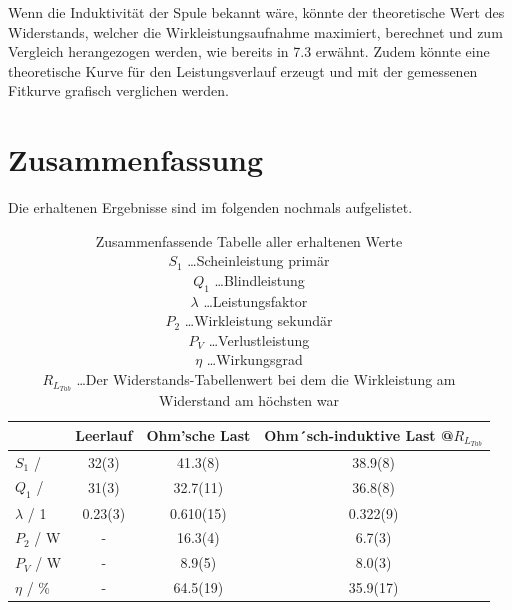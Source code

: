 \documentclass[11pt,ngerman]{scrartcl}
\begin{document}
\vspace{2mm}

Wenn die Induktivität der Spule bekannt wäre, könnte der theoretische Wert des
Widerstands, welcher die Wirkleistungsaufnahme maximiert, berechnet und
zum Vergleich herangezogen werden, wie bereits in 7.3 erwähnt. Zudem könnte eine theoretische Kurve für den
Leistungsverlauf erzeugt und mit der gemessenen Fitkurve grafisch verglichen
werden.





\section{Zusammenfassung}

Die erhaltenen Ergebnisse sind im folgenden nochmals aufgelistet.

\begin{table}[H]
	\caption{Zusammenfassende Tabelle aller erhaltenen Werte \\
		$S_1$ \dots Scheinleistung primär \\
		$Q_1$ \dots  Blindleistung\\
		$\lambda$ \dots Leistungsfaktor\\
		$P_2$ \dots Wirkleistung sekundär \\
		$P_V$ \dots Verlustleistung \\
		$\eta$ \dots Wirkungsgrad \\
		$R_{L_{Tab}}$ \dots Der Widerstands-Tabellenwert bei dem die Wirkleistung am Widerstand am höchsten war \\
	}
	\label{tab:zusammenfassung}
	\begin{center}
		\begin{tabular}[c]{l|S[table-format=2.2(2)]|S[table-format=2.3(2)]|S[table-format=2.3(2)]}
			\hline
			{}                     & {Leerlauf} & {Ohm'sche Last} & {Ohm´sch-induktive Last @$R_{L_{Tab}}$} \\
			\hline
			$S_1$ / \si{\va}       & 32(3)      & 41.3(8)         & 38.9(8)                                 \\
			$Q_1$ / \si{\var}      & 31(3)      & 32.7(11)        & 36.8(8)                                 \\
			$\lambda$ / 1          & 0.23(3)    & 0.610(15)       & 0.322(9)                                \\
			$P_2$  / \si{\watt}    & {-}        & 16.3(4)         & 6.7(3)                                  \\
			$P_V$  / \si{\watt}    & {-}        & 8.9(5)          & 8.0(3)                                  \\
			$\eta$ / \si{\percent} & {-}        & 64.5(19)        & 35.9(17)                                \\
			\hline
		\end{tabular}
	\end{center}
\end{table}
\end{document}
